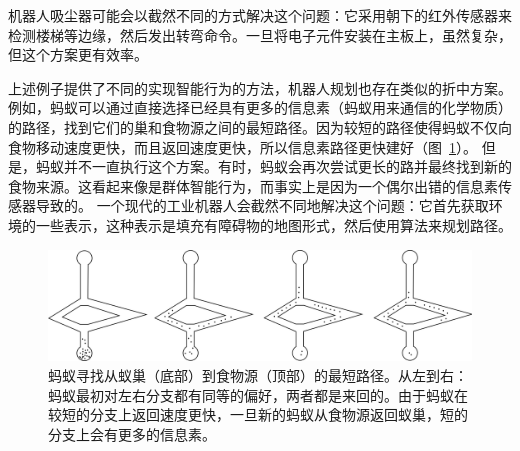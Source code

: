
机器人吸尘器可能会以截然不同的方式解决这个问题：它采用朝下的红外传感器来检测楼梯等边缘，然后发出转弯命令。一旦将电子元件安装在主板上，虽然复杂，但这个方案更有效率。


上述例子提供了不同的实现智能行为的方法，机器人规划也存在类似的折中方案。例如，蚂蚁可以通过直接选择已经具有更多的信息素（蚂蚁用来通信的化学物质）的路径，找到它们的巢和食物源之间的最短路径。因为较短的路径使得蚂蚁不仅向食物移动速度更快，而且返回速度更快，所以信息素路径更快建好（图~\ref{fig:ants}）。 但是，蚂蚁并不一直执行这个方案。有时，蚂蚁会再次尝试更长的路并最终找到新的食物来源。这看起来像是群体智能行为，而事实上是因为一个偶尔出错的信息素传感器导致的。 一个现代的工业机器人会截然不同地解决这个问题：它首先获取环境的一些表示，这种表示是填充有障碍物的地图形式，然后使用算法来规划路径。

\begin{figure}
	\centering
		\includegraphics[width=\textwidth]{figs/ants.png}
	\caption{蚂蚁寻找从蚁巢（底部）到食物源（顶部）的最短路径。从左到右：蚂蚁最初对左右分支都有同等的偏好，两者都是来回的。由于蚂蚁在较短的分支上返回速度更快，一旦新的蚂蚁从食物源返回蚁巢，短的分支上会有更多的信息素。}
	\label{fig:ants}
\end{figure}

